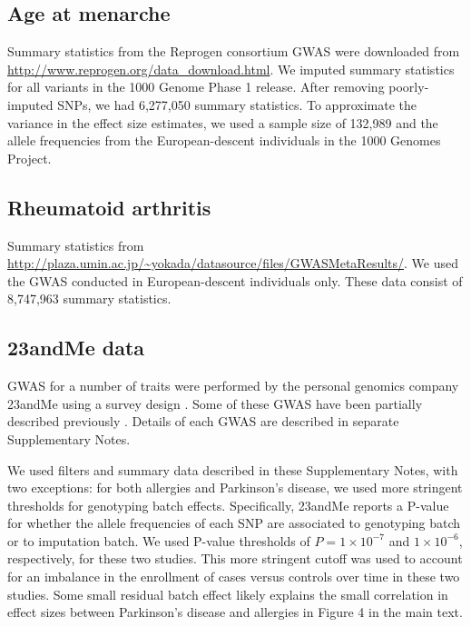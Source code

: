 \documentclass[11pt,titlepage]{article}
\begin{document}
\subsection{Age at menarche}
Summary statistics from the Reprogen consortium GWAS \citep{Perry:2014aa} were downloaded from \url{http://www.reprogen.org/data_download.html}. We imputed summary statistics for all variants in the 1000 Genome Phase 1 release. After removing poorly-imputed SNPs, we had 6,277,050 summary statistics. To approximate the variance in the effect size estimates, we used a sample size of 132,989 and the allele frequencies from the European-descent individuals in the 1000 Genomes Project. 


\subsection{Rheumatoid arthritis}
Summary statistics from \url{http://plaza.umin.ac.jp/~yokada/datasource/files/GWASMetaResults/}. We used the GWAS conducted in European-descent individuals only. These data consist of 8,747,963 summary statistics.

\subsection{23andMe data} 
GWAS for a number of traits were performed by the personal genomics company 23andMe using a survey design \citep{Eriksson:2010aa}. Some of these GWAS have been partially described previously \citep{Eriksson:2012ab, Eriksson:2012aa, Eriksson:2010aa, Do:2011aa, Kiefer:2013aa}. Details of each GWAS are described in separate Supplementary Notes.

We used filters and summary data described in these Supplementary Notes, with two exceptions: for both allergies and Parkinson's disease, we used more stringent thresholds for genotyping batch effects. Specifically, 23andMe reports a P-value for whether the allele frequencies of each SNP are associated to genotyping batch or to imputation batch. We used P-value thresholds of $P = 1\times 10^{-7}$ and $1\times10^{-6}$, respectively, for these two studies. This more stringent cutoff was used to account for an imbalance in the enrollment of cases versus controls over time in these two studies. Some small residual batch effect likely explains the small correlation in effect sizes between Parkinson's disease and allergies in Figure 4 in the main text.

%
\end{document}
